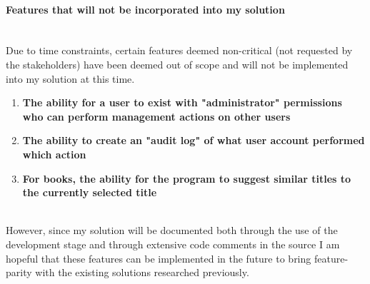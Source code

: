 \documentclass[../../../main.tex]{subfiles}
\begin{document}
\paragraph{Features that will not be incorporated into my solution}

\noindent \\ Due to time constraints, certain features deemed non-critical (not requested by the stakeholders)
have been deemed out of scope and will not be implemented into my solution at this time.

\begin{enumerate}
      \item \textbf{The ability for a user to exist with "administrator" permissions who can perform management actions on other users}
      \item \textbf{The ability to create an "audit log" of what user account performed which action}
      \item \textbf{For books, the ability for the program to suggest similar titles to the currently selected title}
\end{enumerate}

\noindent \\ However, since my solution will be documented both through the use of the
development stage and through extensive code comments in the source I am hopeful that these
features can be implemented in the future to bring feature-parity with the existing solutions
researched previously.
\end{document}
